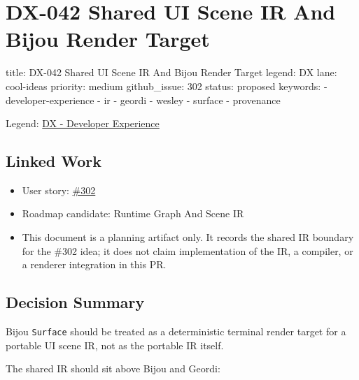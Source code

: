 \chapter{DX-042 Shared UI Scene IR And Bijou Render Target}\label{record-138}

\smallskip

\begin{RecordMeta}
title: DX-042 Shared UI Scene IR And Bijou Render Target
legend: DX
lane: cool-ideas
priority: medium
github_issue: 302
status: proposed
keywords:
  - developer-experience
  - ir
  - geordi
  - wesley
  - surface
  - provenance

\end{RecordMeta}

Legend: \href{https://github.com/flyingrobots/bijou/blob/1853ad902f6bf219326409e7f743a5a1d6517dbc/docs/legends/DX-developer-experience.md}{DX - Developer Experience}

\section{Linked Work}\label{record-138-linked-work}

\begin{itemize}
\tightlist
\item
  User story: \href{https://github.com/flyingrobots/bijou/issues/302}{\#302}
\item
  Roadmap candidate: Runtime Graph And Scene IR
\item
  This document is a planning artifact only. It records the shared IR boundary for the \#302 idea; it does not claim implementation of the IR, a compiler, or a renderer integration in this PR.
\end{itemize}

\section{Decision Summary}\label{record-138-decision-summary}

Bijou \texttt{S\allowbreak{}u\allowbreak{}r\allowbreak{}f\allowbreak{}a\allowbreak{}c\allowbreak{}e} should be treated as a deterministic terminal render target for a portable UI scene IR, not as the portable IR itself.

The shared IR should sit above Bijou and Geordi:

